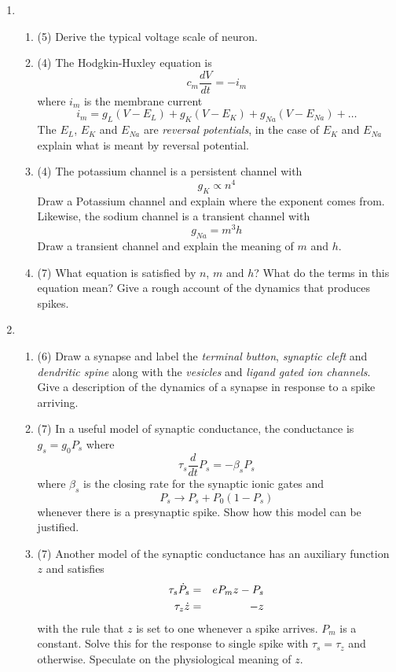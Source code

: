 \documentclass[12pt]{article}
\begin{document}
\begin{enumerate} %

\item %
\begin{enumerate}
\item (5) Derive the typical voltage scale of neuron.
\item (4) The Hodgkin-Huxley equation is
\begin{equation}
c_m\frac{dV}{dt}=-i_m
\end{equation}
where $i_m$ is the membrane current
\begin{equation}
i_m=g_L(V-E_L)+g_K(V-E_K)+g_{Na}(V-E_{Na})+\ldots
\end{equation}
The $E_L$, $E_K$ and $E_{Na}$ are {\sl reversal potentials}, in the
case of $E_K$ and $E_{Na}$ explain what is meant by reversal
potential.
\item (4) The potassium channel is a persistent channel with
\begin{equation}
g_{K}\propto n^4
\end{equation}
Draw a Potassium channel and explain where the exponent comes from. Likewise, the sodium channel is a transient channel with
\begin{equation}
g_{Na}=m^3h
\end{equation}
Draw a transient channel and explain the meaning of $m$ and $h$.
\item (7) What equation is satisfied by $n$, $m$ and $h$? What do the terms in this equation mean? Give a rough account of the dynamics that produces spikes.
\end{enumerate}

\vfill

\item %
\begin{enumerate}
\item (6) Draw a synapse and label the {\sl terminal button}, {\sl synaptic cleft} and {\sl dendritic spine} along with the {\sl vesicles} and {\sl ligand gated ion channels}. Give a description of the dynamics of a synapse in response to a spike arriving.
\item (7) In a useful model of synaptic conductance, the conductance is $g_s=g_0P_s$ where 
\begin{equation}
\tau_s\frac{d}{dt}P_s=-\beta_sP_s
\end{equation}
where $\beta_s$ is the closing rate for the synaptic ionic gates and
\begin{equation}
P_s\rightarrow P_s+P_0(1-P_s)
\end{equation}
whenever there is a presynaptic spike. Show how this model can be justified. 
\item (7) Another model of the synaptic conductance has an auxiliary function $z$ and satisfies
\begin{eqnarray}
\tau_s\dot{P}_s&=&eP_mz-P_s\cr
\tau_z\dot{z}&=&-z
\end{eqnarray}
with the rule that $z$ is set to one whenever a spike arrives. $P_m$
is a constant. Solve this for the response to single spike with
$\tau_s=\tau_z$ and otherwise. Speculate on the physiological meaning
of $z$.


\end{enumerate}
\end{enumerate}
\end{document}
